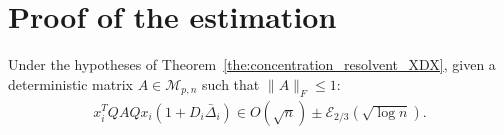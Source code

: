 \documentclass[a4papaer, titlepage]{book}
\begin{document}
\section{Proof of the estimation}\label{app:estimation_resolvent}
 \begin{lemma}\label{lem:COncentration_xQAQyd}
   Under the hypotheses of Theorem~\ref{the:concentration_resolvent_XDX}, given a deterministic matrix $A \in \mathcal M_{p,n}$ such that $\|A\|_F\leq 1$:
   \begin{align*}
     x_i^TQAQx_i (1+D_i\bar \Delta_i) \in O(\sqrt n) \pm \mathcal E_{2/3} \left(\sqrt{\log n}\right).
   \end{align*}
 \end{lemma}
\end{document}
